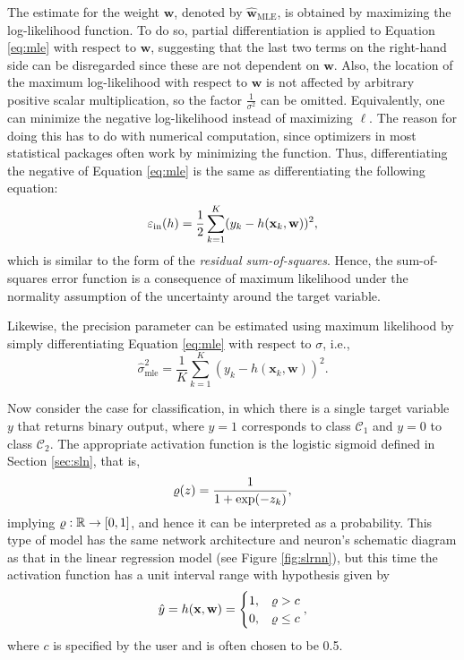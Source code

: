 The estimate for the weight $\mathbf{w}$, denoted by $\hat{\mathbf{w}}_{\mathrm{MLE}}$, is obtained by maximizing the log-likelihood function. To do so, partial differentiation is applied to Equation \ref{eq:mle} with respect to $\mathbf{w}$, suggesting that the last two terms on the right-hand side can be disregarded since these are not dependent on $\mathbf{w}$. Also, the location of the maximum log-likelihood with respect to $\mathbf{w}$ is not affected by arbitrary positive scalar multiplication, so the factor $\frac{1}{\sigma^2}$ can be omitted. Equivalently, one can minimize the negative log-likelihood instead of maximizing $\ell$. The reason for doing this has to do with numerical computation, since optimizers in most statistical packages often work by minimizing the function. Thus, differentiating the negative of Equation \ref{eq:mle} is the same as differentiating the following equation:
\begin{equation}
\label{eq:regin}
\varepsilon_{\mathrm{in}}(h)=\frac{1}{2}\sum_{k=1}^K(y_k-h(\mathbf{x}_k,\mathbf{w}))^2,
\end{equation}
which is similar to the form of the \textit{residual sum-of-squares}. Hence, the sum-of-squares error function is a consequence of maximum likelihood under the normality assumption of the uncertainty around the target variable.

Likewise, the precision parameter can be estimated using maximum likelihood by simply differentiating Equation \ref{eq:mle} with respect to $\sigma$, i.e.,
$$
\hat{\sigma}_{\mathrm{mle}}^2=\frac{1}{K}\sum_{k=1}^K(y_k-h(\mathbf{x}_k,\mathbf{w}))^2.
$$

Now consider the case for classification, in which there is a single target variable $y$ that returns binary output, where $y=1$ corresponds to class $\mathcal{C}_1$ and $y=0$ to class $\mathcal{C}_2$. The appropriate activation function is the logistic sigmoid defined in Section \ref{sec:sln}, that is, 
$$
\varrho(z)=\frac{1}{1+\exp(-z_k)},
$$
implying $\varrho:\mathbb{R}\to[0,1]$, and hence it can be interpreted as a probability. This type of model has the same network architecture and neuron's schematic diagram as that in the linear regression model (see Figure \ref{fig:slrnn}), but this time the activation function has a unit interval range with hypothesis given by
$$\hat{y}=h(\mathbf{x},\mathbf{w})=\begin{cases}
1,&\varrho>c\\
0,&\varrho\leq c
\end{cases},$$
where $c$ is specified by the user and is often chosen to be 0.5.

